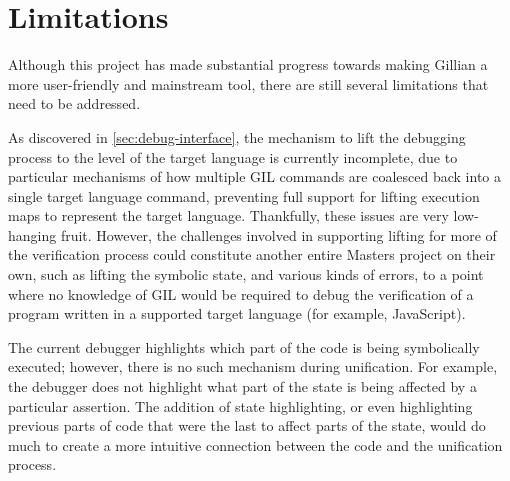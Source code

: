 \section{Limitations}%
\label{sec:eval:limitations}

Although this project has made substantial progress towards making Gillian a
more user-friendly and mainstream tool, there are still several limitations that
need to be addressed.

As discovered in \autoref{sec:debug-interface}, the mechanism to lift the
debugging process to the level of the target language is currently incomplete,
due to particular mechanisms of how multiple GIL commands are coalesced back
into a single target language command, preventing full support for lifting
execution maps to represent the target language.
Thankfully, these issues are very low-hanging fruit. However, the challenges
involved in supporting lifting for more of the verification process could
constitute another entire Masters project on their own, such as lifting the
symbolic state, and various kinds of errors, to a point where no knowledge of
GIL would be required to debug the verification of a program written in a
supported target language (for example, JavaScript).

The current debugger highlights which part of the code is being symbolically
executed; however, there is no such mechanism during unification.
For example, the debugger does not highlight what part of the state is being
affected by a particular assertion. The addition of state highlighting, or even
highlighting previous parts of code that were the last to affect parts of the
state, would do much to create a more intuitive connection between the code and
the unification process.

